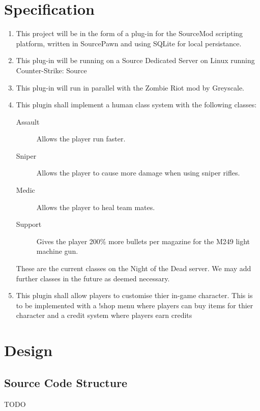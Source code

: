 \documentclass[a4paper, 11pt]{article}
\begin{document}
\section{Specification}
\begin{enumerate}
\item This project will be in the form of a plug-in for the SourceMod\cite{1} scripting platform, written in SourcePawn and using SQLite for local persistance.
\item This plug-in will be running on a Source Dedicated Server on Linux running Counter-Strike: Source
\item This plug-in will run in parallel with the Zombie Riot mod by Greyscale\cite{2}.
\item This plugin shall implement a human class system with the following classes:
\begin{description}
\item[Assault] Allows the player run faster.
\item[Sniper] Allows the player to cause more damage when using sniper rifles.
\item[Medic] Allows the player to heal team mates.
\item[Support] Gives the player 200\% more bullets per magazine for the M249 light machine gun.
\end{description}
These are the current classes on the Night of the Dead server. We may add further classes in the future as deemed necessary.
\item This plugin shall allow players to customise thier in-game character. This is to be implemented with a !shop menu where players can buy items for thier character and a credit system where players earn credits 
\end{enumerate}

\section{Design}

\subsection{Source Code Structure}
TODO
\end{document}

